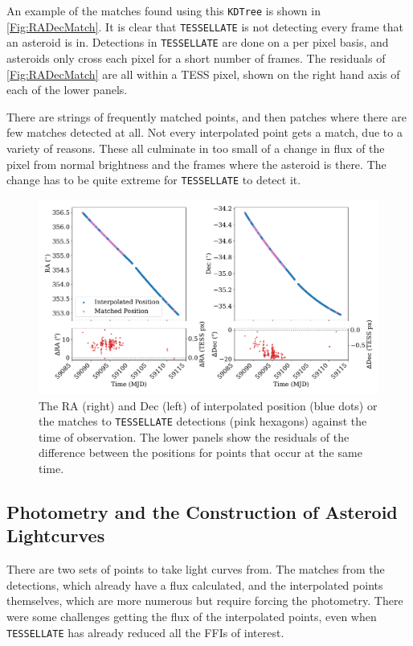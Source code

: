 \documentclass{UCreport}
\begin{document}
An example of the matches found using this \texttt{KDTree} is shown in \autoref{Fig:RADecMatch}.
It is clear that \texttt{TESSELLATE} is not detecting every frame that an asteroid is in.
Detections in \texttt{TESSELLATE} are done on a per pixel basis, and asteroids only cross each pixel for a short number of frames.
The residuals of \autoref{Fig:RADecMatch} are all within a TESS pixel, shown on the right hand axis of each of the lower panels.

There are strings of frequently matched points, and then patches where there are few matches detected at all.
Not every interpolated point gets a match, due to a variety of reasons.
These all culminate in too small of a change in flux of the pixel from normal brightness and the frames where the asteroid is there.
The change has to be quite extreme for \texttt{TESSELLATE} to detect it.


\begin{figure}[]
  \centering
  \includegraphics[width =\textwidth]{./Figures/DetectMatchPosUlysses.pdf}
  \caption[Interpolated and Detected Positions]{The RA (right) and Dec (left) of interpolated position (blue dots) or the matches to \texttt{TESSELLATE} detections (pink hexagons) against the time of observation. The lower panels show the residuals of the difference between the positions for points that occur at the same time.}
  \label{Fig:RADecMatch}
\end{figure}

\subsection{Photometry and the Construction of Asteroid Lightcurves}\label{SubSec:Lightcurves}

There are two sets of points to take light curves from.
The matches from the detections, which already have a flux calculated, and the interpolated points themselves, which are more numerous but require forcing the photometry.
There were some challenges getting the flux of the interpolated points, even when \texttt{TESSELLATE} has already reduced all the FFIs of interest.
\end{document}
